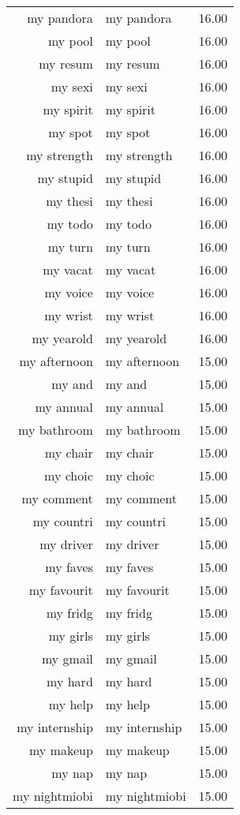 \begin{table}[ht]
\begin{tabular}{rlr}
  my pandora & my pandora & 16.00 \\ 
  my pool & my pool & 16.00 \\ 
  my resum & my resum & 16.00 \\ 
  my sexi & my sexi & 16.00 \\ 
  my spirit & my spirit & 16.00 \\ 
  my spot & my spot & 16.00 \\ 
  my strength & my strength & 16.00 \\ 
  my stupid & my stupid & 16.00 \\ 
  my thesi & my thesi & 16.00 \\ 
  my todo & my todo & 16.00 \\ 
  my turn & my turn & 16.00 \\ 
  my vacat & my vacat & 16.00 \\ 
  my voice & my voice & 16.00 \\ 
  my wrist & my wrist & 16.00 \\ 
  my yearold & my yearold & 16.00 \\ 
  my afternoon & my afternoon & 15.00 \\ 
  my and & my and & 15.00 \\ 
  my annual & my annual & 15.00 \\ 
  my bathroom & my bathroom & 15.00 \\ 
  my chair & my chair & 15.00 \\ 
  my choic & my choic & 15.00 \\ 
  my comment & my comment & 15.00 \\ 
  my countri & my countri & 15.00 \\ 
  my driver & my driver & 15.00 \\ 
  my faves & my faves & 15.00 \\ 
  my favourit & my favourit & 15.00 \\ 
  my fridg & my fridg & 15.00 \\ 
  my girls & my girls & 15.00 \\ 
  my gmail & my gmail & 15.00 \\ 
  my hard & my hard & 15.00 \\ 
  my help & my help & 15.00 \\ 
  my internship & my internship & 15.00 \\ 
  my makeup & my makeup & 15.00 \\ 
  my nap & my nap & 15.00 \\ 
  my nightmiobi & my nightmiobi & 15.00 \\ 

\end{tabular}
\end{table}

